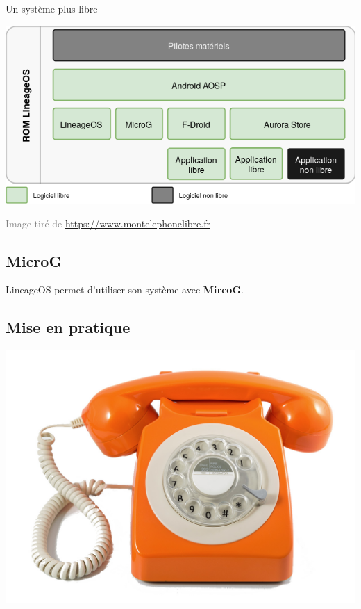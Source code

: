 \documentclass[aspectratio=169]{beamer}
\begin{document}
\begin{frame}{Un système plus libre}
\begin{center}
\includegraphics[width=.75\textwidth]{schemas/Android_free.png}
\end{center}
\textcolor{gray}{\tiny{Image tiré de \url{https://www.montelephonelibre.fr}}}
\end{frame}

\subsection{MicroG}
\begin{frame}
LineageOS permet d'utiliser son système avec \textbf{MircoG}.\newline
\end{frame}

\subsection{Mise en pratique}
\begin{frame}
\begin{center}
\includegraphics[width=.50\textwidth]{images/retro-phone.jpg}
\end{center}
\end{frame}
\end{document}
